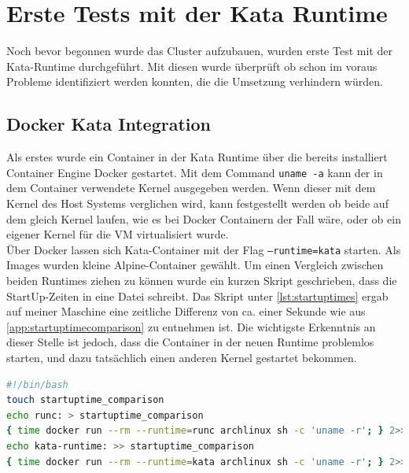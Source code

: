 \section{Erste Tests mit der Kata Runtime}
\label{ref:lokale_kata_tests}
Noch bevor begonnen wurde das Cluster aufzubauen, wurden erste Test mit der Kata-Runtime durchgeführt. 
Mit diesen wurde überprüft ob schon im voraus Probleme identifiziert werden konnten, die die Umsetzung verhindern würden. 

\subsection{Docker Kata Integration}
Als erstes wurde ein Container in der Kata Runtime über die bereits installiert Container Engine Docker gestartet.
Mit dem Command \texttt{uname -a} kann der in dem Container verwendete Kernel ausgegeben werden. 
Wenn dieser mit dem Kernel des Host Systems verglichen wird, kann festgestellt werden ob beide auf dem gleich Kernel laufen, wie es bei Docker Containern der Fall wäre, oder ob ein eigener Kernel für die VM virtualisiert wurde.
\\
Über Docker lassen sich Kata-Container mit der Flag \texttt{--runtime=kata} starten.
Als Images wurden kleine Alpine-Container gewählt.
Um einen Vergleich zwischen beiden Runtimes ziehen zu können wurde ein kurzen Skript geschrieben, dass die StartUp-Zeiten in eine Datei schreibt.
Das Skript unter \ref{lst:startuptimes} ergab auf meiner Maschine eine zeitliche Differenz von ca. einer Sekunde wie aus \ref{app:startuptimecomparison} zu entnehmen ist. 
Die wichtigste Erkenntnis an dieser Stelle ist jedoch, dass die Container in der neuen Runtime problemlos starten, und dazu tatsächlich einen anderen Kernel gestartet bekommen.

\begin{lstlisting}[language=bash, caption={compare\_startup\_times.sh}, label=lst:startuptimes]
#!/bin/bash
touch startuptime_comparison
echo runc: > startuptime_comparison
{ time docker run --rm --runtime=runc archlinux sh -c 'uname -r'; } 2>> startuptime_comparison
echo kata-runtime: >> startuptime_comparison
{ time docker run --rm --runtime=kata archlinux sh -c 'uname -r'; } 2>> startuptime_comparison
\end{lstlisting}

